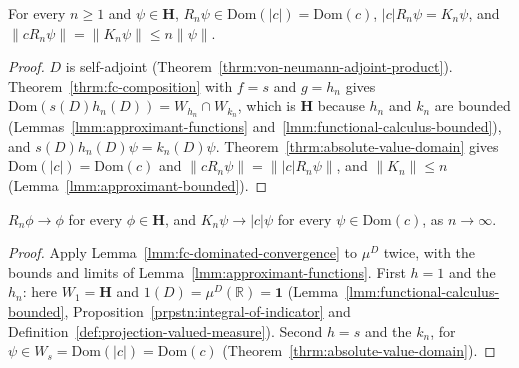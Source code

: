 \begin{lemma}
    \label{lmm:approximant-range}
    \leanok
    For every $n \ge 1$ and $\psi \in \mathbf{H}$, $R_n\psi \in \text{Dom}(|c|) = \text{Dom}(c)$, $|c|R_n\psi = K_n\psi$, and $\|cR_n\psi\| = \|K_n\psi\| \le n\|\psi\|$.
\end{lemma}
\begin{proof}
    \leanok
    $D$ is self-adjoint (Theorem~\ref{thrm:von-neumann-adjoint-product}). Theorem~\ref{thrm:fc-composition} with $f = s$ and $g = h_n$ gives $\text{Dom}(s(D)h_n(D)) = W_{h_n} \cap W_{k_n}$, which is $\mathbf{H}$ because $h_n$ and $k_n$ are bounded (Lemmas~\ref{lmm:approximant-functions} and~\ref{lmm:functional-calculus-bounded}), and $s(D)h_n(D)\psi = k_n(D)\psi$. Theorem~\ref{thrm:absolute-value-domain} gives $\text{Dom}(|c|) = \text{Dom}(c)$ and $\|cR_n\psi\| = \||c|R_n\psi\|$, and $\|K_n\| \le n$ (Lemma~\ref{lmm:approximant-bounded}).
\end{proof}

\begin{lemma}
    \label{lmm:approximant-convergence}
    \leanok
    $R_n\phi \to \phi$ for every $\phi \in \mathbf{H}$, and $K_n\psi \to |c|\psi$ for every $\psi \in \text{Dom}(c)$, as $n \to \infty$.
\end{lemma}
\begin{proof}
    \leanok
    Apply Lemma~\ref{lmm:fc-dominated-convergence} to $\mu^D$ twice, with the bounds and limits of Lemma~\ref{lmm:approximant-functions}. First $h = 1$ and the $h_n$: here $W_1 = \mathbf{H}$ and $1(D) = \mu^D(\mathbb{R}) = \mathbf{1}$ (Lemma~\ref{lmm:functional-calculus-bounded}, Proposition~\ref{prpstn:integral-of-indicator} and Definition~\ref{def:projection-valued-measure}). Second $h = s$ and the $k_n$, for $\psi \in W_s = \text{Dom}(|c|) = \text{Dom}(c)$ (Theorem~\ref{thrm:absolute-value-domain}).
\end{proof}

